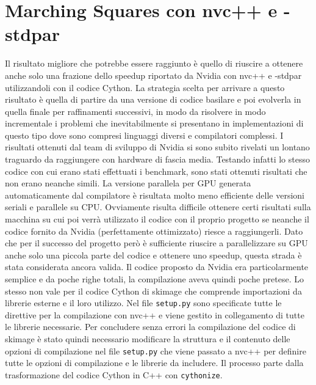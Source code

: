 \documentclass[12pt,a4paper]{report}
\begin{document}
\section{Marching Squares con nvc++ e -stdpar}
Il risultato migliore che potrebbe essere raggiunto è quello di riuscire a ottenere anche solo una frazione dello speedup riportato da Nvidia con nvc++ e -stdpar utilizzandoli con il codice Cython.\newline
La strategia scelta per arrivare a questo risultato è quella di partire da una versione di codice basilare e poi evolverla in quella finale per raffinamenti successivi, in modo da risolvere in modo incrementale i problemi che inevitabilmente si presentano in implementazioni di questo tipo dove sono compresi linguaggi diversi e compilatori complessi. \newline 
I risultati ottenuti dal team di sviluppo di Nvidia si sono subito rivelati un lontano traguardo da raggiungere con hardware di fascia media. 
Testando infatti lo stesso codice con cui erano stati effettuati i benchmark, sono stati ottenuti risultati che non erano neanche simili. 
La versione parallela per GPU generata automaticamente dal compilatore è risultata molto meno efficiente delle versioni seriali e parallele su CPU. Ovviamente risulta difficile ottenere certi risultati sulla macchina su cui poi verrà utilizzato il codice con il proprio progetto se neanche il codice fornito da Nvidia (perfettamente ottimizzato) riesce a raggiungerli. Dato che per il successo del progetto però è sufficiente riuscire a parallelizzare su GPU anche solo una piccola parte del codice e ottenere uno speedup, questa strada è stata considerata ancora valida. \newline
Il codice proposto da Nvidia era particolarmente semplice e da poche righe totali, la compilazione aveva quindi poche pretese. Lo stesso non vale per il codice Cython di skimage che comprende importazioni da librerie esterne e il loro utilizzo. Nel file \verb|setup.py| sono specificate tutte le direttive per la compilazione con nvc++ e viene gestito in collegamento di tutte le librerie necessarie. Per concludere senza errori la compilazione del codice di skimage è stato quindi necessario modificare la struttura e il contenuto delle opzioni di compilazione nel file \verb|setup.py| che viene passato a nvc++ per definire tutte le opzioni di compilazione e le librerie da includere. %
Il processo parte dalla trasformazione del codice Cython in C++ con \verb|cythonize|. \\[10pt]
\end{document}
